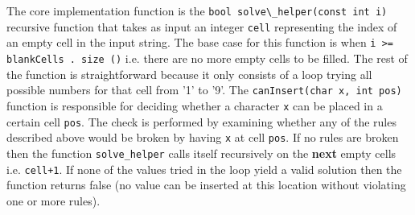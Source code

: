 The core implementation function is the \lstinline[columns=fixed]{bool solve\_helper(const int i)}
recursive function that takes as input an integer \lstinline[columns=fixed]{cell} representing the
index of an empty cell in the input string. The base case for this function is when
\lstinline[columns=fixed]{i >= blankCells . size ()} i.e. there are no more empty cells to be filled.
The rest of the function is straightforward because it only consists of a loop trying all
possible numbers for that cell from '1' to '9'. The \lstinline[columns=fixed]{canInsert(char x, int pos)} function is responsible
for deciding whether a character \lstinline[columns=fixed]{x} can be placed in a certain cell
\lstinline[columns=fixed]{pos}. The check is performed by examining whether any of the rules
described above would be broken by having \lstinline[columns=fixed]{x} at cell
\lstinline[columns=fixed]{pos}. If no rules are broken then the function
\lstinline[columns=fixed]{solve_helper} calls itself recursively on the \textbf{next} empty cells
i.e. \lstinline[columns=fixed]{cell+1}. If none of the values tried in the loop yield a valid
solution then the function returns false (no value can be inserted at this location without
violating one or more rules).

